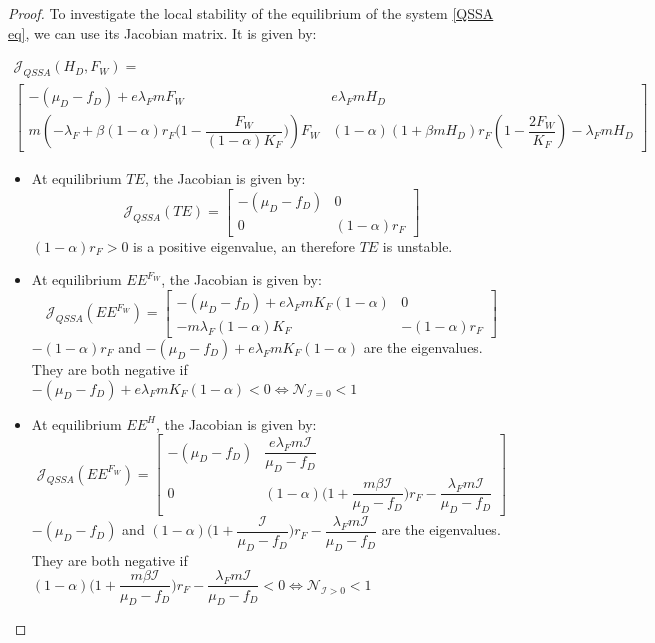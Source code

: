 \documentclass{article}
\newcommand{\lfw}{\lambda_{F}}
\newcommand{\lfw}{\lambda_{F}}
\newcommand{\cI}{\mathcal{I}}
\begin{document}
\begin{proof}

To investigate the local stability of the equilibrium of the system \eqref{QSSA eq}, we can use its Jacobian matrix. It is given by:

\begin{multline}
\mathcal{J}_{QSSA}(H_D, F_W) = \\ \begin{bmatrix}
-(\mu_D - f_D) + e \lfw m F_W & e \lfw m H_D \\
m\left(-\lfw + \beta (1-\alpha) r_F \Big(1- \dfrac{F_W}{(1-\alpha)K_F} \Big) \right) F_W & (1-\alpha) (1+\beta m H_D) r_F \left(1 - \dfrac{2F_W}{K_F} \right) - \lfw m H_D
\end{bmatrix}
\end{multline}

\begin{itemize}
\item At equilibrium $TE$, the Jacobian is given by:
\begin{equation*}
\mathcal{J}_{QSSA}(TE) = \begin{bmatrix}
-(\mu_D - f_D) &0 \\
0 & (1-\alpha)  r_F 
\end{bmatrix}
\end{equation*}
$(1-\alpha) r_F > 0$ is a positive eigenvalue, an therefore $TE$ is unstable.

\item At equilibrium $EE^{F_W}$, the Jacobian is given by: 
\begin{equation*}
\mathcal{J}_{QSSA}(EE^{F_W}) = \begin{bmatrix}
-(\mu_D - f_D) + e\lfw m K_F(1-\alpha) &0 \\
- m \lfw (1-\alpha)K_F & -(1-\alpha)  r_F 
\end{bmatrix}
\end{equation*}
$-(1-\alpha)  r_F$ and $-(\mu_D - f_D) + e\lfw m K_F(1-\alpha)$ are the eigenvalues. They are both negative if $-(\mu_D - f_D) + e\lfw m K_F(1-\alpha) <0 \Leftrightarrow \mathcal{N}_{\cI = 0} < 1$

\item At equilibrium $EE^{H}$, the Jacobian is given by:
\begin{equation*}
\mathcal{J}_{QSSA}(EE^{F_W}) = \begin{bmatrix}
-(\mu_D - f_D) &  \dfrac{e \lfw m \cI}{\mu_D - f_D} \\
0 & (1-\alpha)\Big(1+ \dfrac{m \beta \cI}{\mu_D - f_D}\Big)  r_F -  \dfrac{\lfw m  \cI}{\mu_D - f_D}
\end{bmatrix}
\end{equation*}
$-(\mu_D - f_D)$ and $(1-\alpha)\Big(1+ \dfrac{\cI}{\mu_D - f_D}\Big)  r_F -  \dfrac{\lfw m  \cI}{\mu_D - f_D}$ are the eigenvalues. They are both negative if $(1-\alpha)\Big(1+ \dfrac{m \beta \cI}{\mu_D - f_D}\Big)  r_F -  \dfrac{\lfw m  \cI}{\mu_D - f_D} <0 \Leftrightarrow \mathcal{N}_{\cI > 0} < 1$



\end{itemize}
\end{proof}
\end{document}
